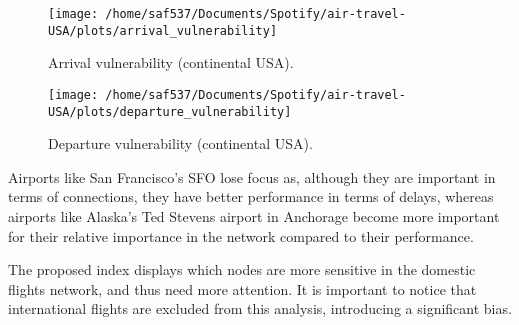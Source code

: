 \documentclass[a4paper, 11pt]{article}
\begin{document}
\begin{figure}[!ht]
  \caption{Arrival vulnerability (continental USA).}
  \label{arr_plot}
  \centering
    \texttt{[image: /home/saf537/Documents/Spotify/air-travel-USA/plots/arrival\_vulnerability]}
\end{figure}






\begin{figure}[!ht]
  \caption{Departure vulnerability (continental USA).}
  \label{dep_plot}
  \centering
    \texttt{[image: /home/saf537/Documents/Spotify/air-travel-USA/plots/departure\_vulnerability]}
\end{figure}


Airports like San Francisco's SFO lose focus as, although they are important in terms of connections, they have better performance in terms of delays, whereas airports like Alaska's Ted Stevens airport in Anchorage become more important for their relative importance in the network compared to their performance. 

The proposed index displays which nodes are more sensitive in the domestic flights network, and thus need more attention. It is important to notice that international flights are excluded from this analysis, introducing a significant bias.


\end{document}
